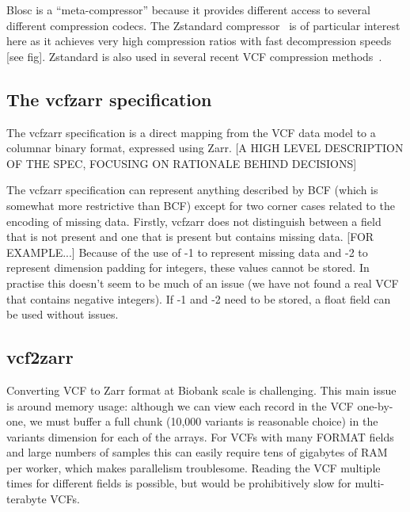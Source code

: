 \documentclass[a4paper,num-refs]{oup-contemporary}
\begin{document}
Blosc is a ``meta-compressor'' because it provides different 
access to several different compression codecs. The 
Zstandard compressor~\citep{collet2021rfc} is of particular 
interest here as it achieves very high compression ratios
with fast decompression speeds [see fig]. 
Zstandard is also used in several recent VCF compression 
methods~\citep[e.g.][]{lefaive2021sparse,wertenbroek2022xsi}.

\subsection{The vcfzarr specification}
The vcfzarr specification is a direct mapping from the VCF data model 
to a columnar binary format, expressed using Zarr. [A HIGH LEVEL 
DESCRIPTION OF THE SPEC, FOCUSING ON RATIONALE BEHIND DECISIONS]

The vcfzarr specification can represent anything described by BCF
(which is somewhat more restrictive than BCF) except for two corner
cases related to the encoding of missing data. Firstly, vcfzarr does
not distinguish between a field that is not present and one that 
is present but contains missing data. [FOR EXAMPLE...]
Because of the use of -1 to represent missing data and -2 to 
represent dimension padding for integers, these values 
cannot be stored. In practise this doesn't seem to be much of 
an issue (we have not found a real VCF that contains negative 
integers). If -1 and -2 need to be stored, a float field
can be used without issues.

\subsection{vcf2zarr}
Converting VCF to Zarr format at Biobank scale is challenging. This main issue is 
around memory usage: although we can view each record in the VCF one-by-one,
we must buffer a full chunk (10,000 variants is reasonable choice) 
in the variants dimension for each of the arrays. 
For VCFs with many FORMAT fields and large numbers of samples this can
easily require tens of gigabytes of RAM per worker, which makes 
parallelism troublesome. Reading the VCF multiple times for different fields
is possible, but would be prohibitively slow for multi-terabyte VCFs.
\end{document}
